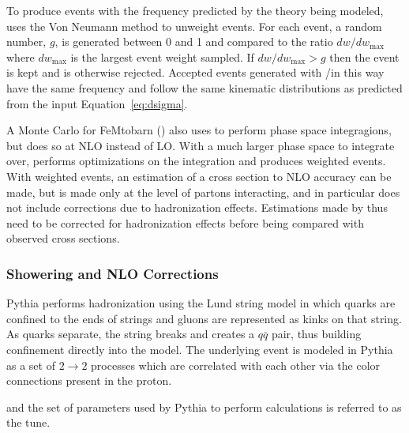  To produce events with the frequency
  predicted by the theory being modeled,
  \MADEVENT uses the Von Neumann method to unweight events.
 For each event, a random number, $g$, is generated 
  between 0 and 1 and compared to the ratio
  $dw/dw_{\mathrm{max}}$ where $dw_{\mathrm{max}}$
  is the largest event weight sampled.
 If $dw/dw_{\mathrm{max}}>g$ then the event is kept
  and is otherwise rejected.
 Accepted events generated with \MADGRAPH/\MADEVENT in this 
  way have the same frequency and follow the same
  kinematic distributions as predicted
  from the input Equation~\ref{eq:dsigma}.
   
 A Monte Carlo for FeMtobarn (\MCFM)
  also uses \VEGAS to perform phase space
  integragions, but does so at NLO 
  instead of LO.
 With a much larger phase space to 
  integrate over, \MCFM performs optimizations
  on the integration and produces weighted events.
 With weighted events, an estimation of
  a cross section to NLO accuracy can be made,
  but is made only at the level of partons interacting,
  and in particular does not include corrections
  due to hadronization effects.
 Estimations made by \MCFM thus need to 
  be corrected for hadronization effects
  before being compared with observed cross sections.

\subsubsection{Showering and NLO Corrections}
 Pythia performs hadronization using the
  Lund string model in which quarks are
  confined to the ends of strings and
  gluons are represented as kinks on that string.
 As quarks separate, the string breaks and
  creates a $q\overline{q}$ pair, 
  thus building confinement directly into the model.
 The underlying event is modeled in Pythia
  as a set of $2\rightarrow 2$ processes
  which are correlated with each other via the
  color connections present in the proton.


  and the set of parameters used by Pythia
  to perform calculations is referred to as 
  the tune.
 

